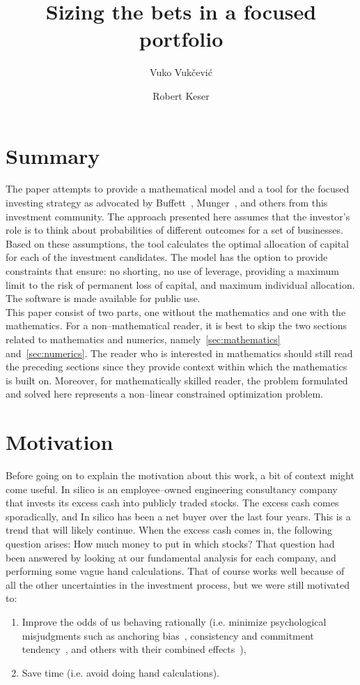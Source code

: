 \documentclass{article}
\title{Sizing the bets in a focused portfolio}
\author[$\dagger$]{Vuko Vuk\v{c}evi\'{c}}
\author[$\dagger$]{Robert Keser}
\affil[$\dagger$]{In silico Ltd., Zagreb, Croatia,\linebreak vuko.vukcevic@insilico.hr, robert.keser@insilico.hr}
\begin{document}
\maketitle

\section{Summary}
\label{sec:summary}

The paper attempts to provide a mathematical model and a tool for the focused
investing strategy as advocated by Buffett~\cite{berkshireLetters},
Munger~\cite{almanack}, and others from this investment community.
The approach presented here assumes that the investor's role is to think about
probabilities of different outcomes for a set of businesses. Based on these
assumptions, the tool calculates the optimal allocation of capital for
each of the investment candidates. The model has the option to provide
constraints that ensure: no shorting, no use of leverage, providing a maximum
limit to the risk of permanent loss of capital, and maximum individual
allocation. The software is made available for public use.\\

This paper consist of two parts, one without the mathematics and one with the
mathematics. For a non--mathematical reader, it is best to skip the two sections
related to mathematics and numerics, namely~\autoref{sec:mathematics}
and~\autoref{sec:numerics}. The reader who is interested in mathematics should
still read the preceding sections since they provide context within which the
mathematics is built on. Moreover, for mathematically skilled reader, the
problem formulated and solved here represents a non--linear constrained
optimization problem.

\section{Motivation}
\label{sec:motivation}

Before going on to explain the motivation about this work, a bit of context
might come useful. In silico is an employee--owned engineering consultancy
company that invests its excess cash into publicly traded stocks. The excess
cash comes sporadically, and In silico has been a net buyer over the last four
years. This is a trend that will likely continue. When the excess cash comes in,
the following question arises: How much money to put in which stocks? That
question had been answered by looking at our fundamental analysis for each
company, and performing some vague hand calculations. That of course works well
because of all the other uncertainties in the investment process, but we were
still motivated to:
\begin{enumerate}
    \item Improve the odds of us behaving rationally (i.e. minimize
    psychological misjudgments such as anchoring bias~\cite{kahneman},
    consistency and commitment tendency~\cite{cialdini}, and
    others with their combined effects~\cite{almanack}),
    \item Save time (i.e. avoid doing hand calculations).
\end{enumerate}
\end{document}
